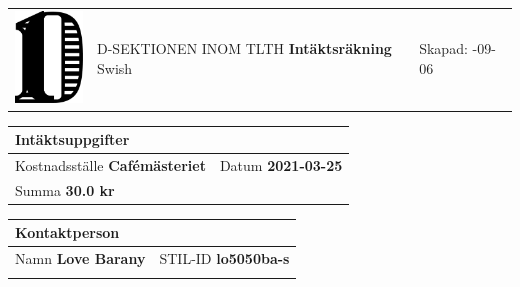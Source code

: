 \documentclass{article}
\newcommand{\skapad}{2021-09-06}
\newcommand{\kostnadsstalle}{Cafémästeriet}
\newcommand{\typ}{Swish}
\newcommand{\datum}{2021-03-25}
\newcommand{\summa}{30.0 kr}
\newcommand{\namn}{Love Barany}
\newcommand{\stilid}{lo5050ba-s}
\begin{document}
    \hspace{-0.3in}
    \begin{tabular}{p{1.0in}p{3.5in}p{2in}}
    \includegraphics[width=0.8in]{D-symbol.pdf} &
    \vspace{-1in}
    {\large \uppercase{D-sektionen inom TLTH}} \newline \newline
    {\Huge \textsf{\textbf{Intäktsräkning}}}
    \newline \newline
    {\large \typ}&
    \vspace{-1in}
    Skapad: \newline
    \skapad \newline
    \end{tabular}

    \vspace{0.5in}
    \hspace{-0.3in}
    \begin{tabular}{|p{1.4in}|p{0.9in}|}
        \multicolumn{2}{l}{Intäktsuppgifter} \\
        \hline
        {\footnotesize Kostnadsställe} \newline \textbf{\kostnadsstalle}&
        {\footnotesize Datum} \newline \textbf{\datum} \\
        \hline
        \multicolumn{2}{|p{2.3in}|}{{\footnotesize Summa} \newline \textbf{\summa}} \\
        \hline
    \end{tabular}
    \hspace{0.1in}
    \begin{tabular}{|p{1.3in}|p{0.9in}|p{1.1in}|}
        \multicolumn{3}{l}{Kontaktperson} \\
        \hline
        \multicolumn{2}{|p{2.2in}|}{{\footnotesize Namn} \newline \textbf{\namn}}
          &
         {\footnotesize STIL-ID} \newline \textbf{\stilid} \\
         \hline
         \multicolumn{3}{p{3.3in}}{{\footnotesize \quad} \newline \textbf{\quad}}
    \end{tabular}
\end{document}
